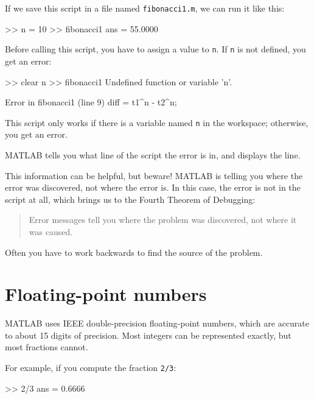 \documentclass[main.tex]{subfiles}
\begin{document}

If we save this script in a file named {\tt fibonacci1.m}, we can run it like this:

\begin{code}
>> n = 10
>> fibonacci1
ans = 55.0000
\end{code}

Before calling this script, you have to assign a value to {\tt n}.
If {\tt n} is not defined, you get an error:

\begin{code}
>> clear n
>> fibonacci1
Undefined function or variable 'n'.

Error in fibonacci1 (line 9)
diff = t1^n - t2^n;
\end{code}

This script only works if there is a variable named {\tt n} in the workspace; otherwise, you get an error.


MATLAB tells you what line of the script the error is in, and displays the line.


This information can be helpful, but beware!  MATLAB is telling you
where the error was discovered, not where the error is.  In this
case, the error is not in the script at all, which brings us to the Fourth Theorem of Debugging:

\begin{quote}
Error messages tell you where the problem was discovered,
not where it was caused.
\end{quote}

Often you have to work backwards to find the source of the problem.


\section{Floating-point numbers}

MATLAB uses IEEE double-precision floating-point numbers, which are accurate to about 15 digits of precision.  Most integers can be represented exactly, but most fractions cannot.


For example, if you compute the fraction {\tt 2/3}:

\begin{code}
>> 2/3
ans = 0.6666
\end{code}
\end{document}
